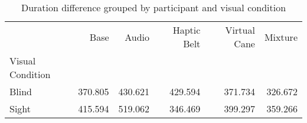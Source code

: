 
\begin{table}[!htb]
\centering
\caption{Duration difference grouped by participant and visual condition}
\label{tab:duracao_average_group}
\begin{tabular}{lrrrrr}
\toprule
{} &    Base &   Audio &  Haptic Belt &  Virtual Cane &  Mixture \\
Visual Condition &         &         &              &               &          \\
\midrule
Blind            & 370.805 & 430.621 &      429.594 &       371.734 &  326.672 \\
Sight            & 415.594 & 519.062 &      346.469 &       399.297 &  359.266 \\
\bottomrule
\end{tabular}
\end{table}

